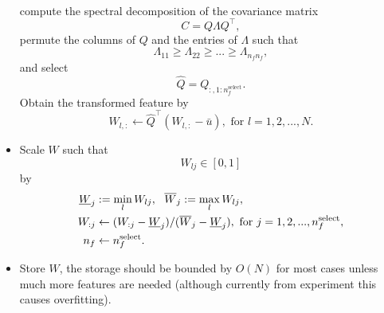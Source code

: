 \documentclass[12pt]{article}
\begin{document}
\begin{itemize}
\begin{equation}
\begin{split}
			\end{split}
		\end{equation}
		compute the spectral decomposition of the covariance matrix
		\begin{equation}
			C = Q\Lambda Q^\top,
		\end{equation}
		permute the columns of $Q$ and the entries of $\Lambda$ such that
		\begin{equation}
			\Lambda_{11} \geq \Lambda_{22} \geq  ... \geq \Lambda_{n_fn_f},
		\end{equation}
		and select
		\begin{equation}
			\hat{Q} = Q_{:, 1:n^\text{select}_f}.
		\end{equation}
		Obtain the transformed feature by
		\begin{equation}
			\label{eq:pca_mol_end}
			W_{l,:} \leftarrow \hat{Q}^\top(W_{l,:} - \bar{u}), \text{ for }l = 1,2,...,N.
		\end{equation}
	\item Scale $W$ such that 
	\begin{equation}
		\label{eq:scale_mol_1}
		W_{lj} \in [0, 1]
	\end{equation}
	by
	\begin{equation}
		\label{eq:scale_mol_2}
		\begin{split}
			\underbar{$W$}_{j} &:= \min_{l} W_{lj}, ~~ \overline{W}_{j} := \max_{l} W_{lj}, \\
			W_{:j} &\leftarrow (W_{:j} - \underbar{$W$}_{j})/ (\overline{W}_{j} - \underbar{$W$}_{j}), \text{ for } j = 1,2,..., n^\text{select}_f, \\
			n_f &\leftarrow n^\text{select}_f.
		\end{split}
	\end{equation}
	\item Store $W$, the storage should be bounded by $O(N)$ for most cases unless much more features are needed (although currently from experiment this causes overfitting).
\end{itemize}
\end{document}
